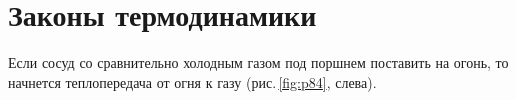 \documentclass[main.tex]{subfiles}
\begin{document}

\pagestyle{empty}

 

\setcounter{section}{52
}
\addtocounter{section}{-1} 

\section{Законы термодинамики}


Если сосуд со сравнительно холодным газом под поршнем поставить на огонь, то начнется теплопередача от огня к газу (рис.\,\ref{fig:p84}, слева).
\end{document}
